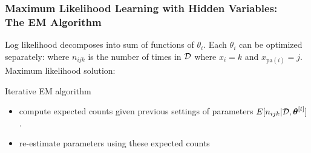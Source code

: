 \begin{frame}
\frametitle{Maximum Likelihood Learning with Hidden Variables: \\ The EM
  Algorithm} 


Log likelihood decomposes into sum of functions of $\theta_i$. Each
$\theta_i$ can be optimized separately:
where $n_{ijk}$ is the number of times in $\mathcal{D}$ where $x_i=k$ and
$x_{\mathrm{pa}(i)} = j$. \\

Maximum likelihood solution:  \\[1ex]


Iterative EM algorithm
\begin{itemize}

\item[]  compute expected counts given previous settings of
parameters  $E[n_{ijk} | \mathcal{D}, \boldsymbol{\theta}^{[t]}]$.

\item[]  re-estimate parameters using these expected counts
\end{itemize}

\end{frame}
